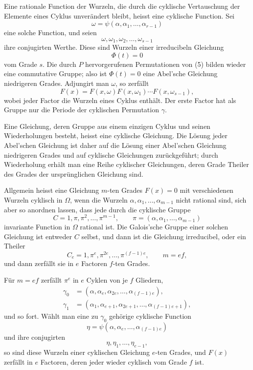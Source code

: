 \documentclass[11pt]{article}
\begin{document}
Eine rationale Function der Wurzeln, die durch die cyklische Vertauschung der Elemente eines Cyklus unverändert bleibt, heisst eine cyklische Function. Sei
\[
        \omega=\psi(\alpha,\alpha_1,
        \ldots,\alpha_{r-1})                                           \tag{4}
\]
eine solche Function, und seien
\[
        \omega,\omega_1,
        \omega_2,
        \ldots,\omega_{s-1}                                           \tag{5}
\]
ihre conjugirten Werthe. Diese sind Wurzeln einer irreducibeln Gleichung
\[
        \Phi(t)=0                                                       \tag{7}
\]
vom Grade $s$. Die durch $P$ hervorgerufenen Permutationen von (5) bilden wieder eine commutative Gruppe; also ist $\Phi(t)=0$ eine Abel'sche Gleichung niedrigeren Grades. Adjungirt man $\omega$, so zerfällt
\[
        F(x)=F(x,\omega)F(x,\omega_1)\cdots F(x,\omega_{s-1}),
\]
wobei jeder Factor die Wurzeln eines Cyklus enthält. Der erste Factor hat als Gruppe nur die Periode der cyklischen Permutation $\gamma$.

Eine Gleichung, deren Gruppe aus einem einzigen Cyklus und seinen Wiederholungen besteht, heisst eine cyklische Gleichung. Die Lösung jeder Abel'schen Gleichung ist daher auf die Lösung einer Abel'schen Gleichung niedrigeren Grades und auf cyklische Gleichungen zurückgeführt; durch Wiederholung erhält man eine Reihe cyklischer Gleichungen, deren Grade Theiler des Grades der ursprünglichen Gleichung sind.

Allgemein heisst eine Gleichung $m$-ten Grades $F(x)=0$ mit verschiedenen Wurzeln cyklisch in $\Omega$, wenn die Wurzeln $\alpha,\alpha_1,\ldots,\alpha_{m-1}$ nicht rational sind, sich aber so anordnen lassen, dass jede durch die cyklische Gruppe
\[
        C=1,\pi,\pi^2,\ldots,\pi^{m-1},\qquad
        \pi=(\alpha,\alpha_1,
        \ldots,\alpha_{m-1})                                           \tag{8}
\]
invariante Function in $\Omega$ rational ist. Die Galois'sche Gruppe einer solchen Gleichung ist entweder $C$ selbst, und dann ist die Gleichung irreducibel, oder ein Theiler
\[
        C_e=1,\pi^e,\pi^{2e},\ldots,\pi^{(f-1)e},
        \qquad m=ef,                                                    \tag{9}
\]
und dann zerfällt sie in $e$ Factoren $f$-ten Grades.

Für $m=ef$ zerfällt $\pi^e$ in $e$ Cyklen von je $f$ Gliedern,
\[
\begin{aligned}
\gamma_0&=(\alpha,\alpha_e,\alpha_{2e},\ldots,\alpha_{(f-1)e}),\\
\gamma_1&=(\alpha_1,\alpha_{e+1},\alpha_{2e+1},\ldots,\alpha_{(f-1)e+1}),
\end{aligned}                                                          \tag{10}
\]
und so fort. Wählt man eine zu $\gamma_0$ gehörige cyklische Function
\[
        \eta=\psi(\alpha,\alpha_e,
        \ldots,\alpha_{(f-1)e})
\]
und ihre conjugirten
\[
        \eta,\eta_1,
        \ldots,\eta_{e-1},                                             \tag{11}
\]
so sind diese Wurzeln einer cyklischen Gleichung $e$-ten Grades, und $F(x)$ zerfällt in $e$ Factoren, deren jeder wieder cyklisch vom Grade $f$ ist.
\end{document}
